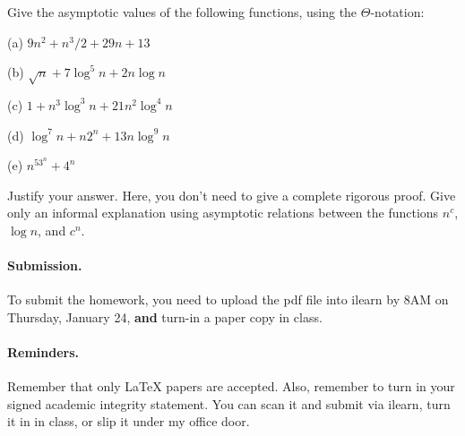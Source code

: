 \documentclass{article}
\begin{document}
\begin{problem}
Give the asymptotic values of the
following functions, using the $\Theta$-notation:
%
\begin{description}
%
\item{(a)} $9n^2 + n^3/2 + 29n + 13$
\item{(b)} $\sqrt{n}+ 7\log^5 n + 2n\log n$
\item{(c)} $1+ n^3\log^3n + 21 n^2\log^4n$
\item{(d)} $\log^7n + n 2^n + 13n\log^9n$
\item{(e)} $n^53^n+4^n$
%
\end{description}
%
Justify your answer.
Here, you don't need to give a complete rigorous proof.
Give only an informal explanation using asymptotic
relations between the functions $n^c$, $\log n$, and $c^n$.
\end{problem}


\vskip 0.1in
\paragraph{Submission.}
To submit the homework, you need to upload the pdf file into ilearn by 8AM on Thursday, January 24,
\textbf{and} turn-in a paper copy in class.

\paragraph{Reminders.}
Remember that only {\LaTeX} papers are accepted. Also,
remember to turn in your signed academic integrity statement.
You can scan it and submit via ilearn, turn it in in class, or
slip it under my office door.
\end{document}
